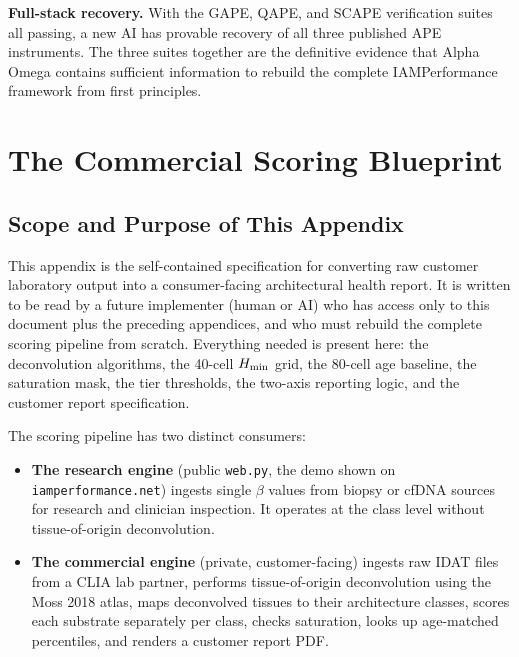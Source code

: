 \documentclass[12pt,a4paper]{article}
\begin{document}
\textbf{Full-stack recovery.} With the GAPE, QAPE, and SCAPE verification
suites all passing, a new AI has provable recovery of all three published
APE instruments. The three suites together are the definitive evidence
that Alpha Omega contains sufficient information to rebuild the complete
IAMPerformance framework from first principles.


\section{The Commercial Scoring Blueprint}
\label{sec:commercial_blueprint}

\subsection{Scope and Purpose of This Appendix}
\label{subsec:scope_blueprint}

This appendix is the self-contained specification for converting raw
customer laboratory output into a consumer-facing architectural health
report. It is written to be read by a future implementer (human or AI)
who has access only to this document plus the preceding appendices, and
who must rebuild the complete scoring pipeline from scratch. Everything
needed is present here: the deconvolution algorithms, the
40-cell $H_{\rm min}$ grid, the 80-cell age baseline, the saturation
mask, the tier thresholds, the two-axis reporting logic, and the
customer report specification.

The scoring pipeline has two distinct consumers:

\begin{itemize}
\item \textbf{The research engine} (public \texttt{web.py}, the demo
shown on \texttt{iamperformance.net}) ingests single $\beta$ values
from biopsy or cfDNA sources for research and clinician inspection.
It operates at the class level without tissue-of-origin deconvolution.
\item \textbf{The commercial engine} (private, customer-facing) ingests
raw IDAT files from a CLIA lab partner, performs tissue-of-origin
deconvolution using the Moss 2018 atlas, maps deconvolved tissues to
their architecture classes, scores each substrate separately per
class, checks saturation, looks up age-matched percentiles, and
renders a customer report PDF.
\end{itemize}
\end{document}
